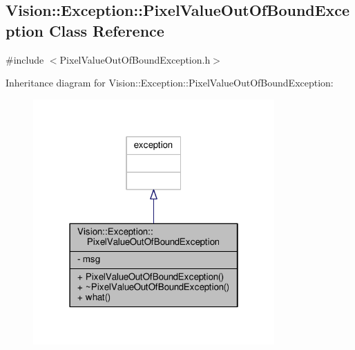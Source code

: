 \hypertarget{class_vision_1_1_exception_1_1_pixel_value_out_of_bound_exception}{}\subsection{Vision\+:\+:Exception\+:\+:Pixel\+Value\+Out\+Of\+Bound\+Exception Class Reference}
\label{class_vision_1_1_exception_1_1_pixel_value_out_of_bound_exception}


{\ttfamily \#include $<$Pixel\+Value\+Out\+Of\+Bound\+Exception.\+h$>$}



Inheritance diagram for Vision\+:\+:Exception\+:\+:Pixel\+Value\+Out\+Of\+Bound\+Exception\+:
\nopagebreak
\begin{figure}[H]
\begin{center}
\leavevmode
\includegraphics[width=262pt]{class_vision_1_1_exception_1_1_pixel_value_out_of_bound_exception__inherit__graph}
\end{center}
\end{figure}


